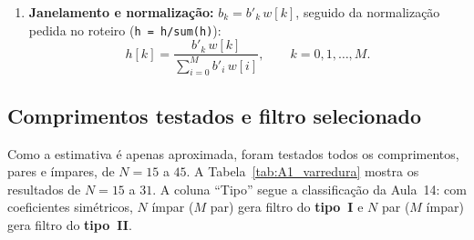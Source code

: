\documentclass[11pt,a4paper]{article}
\begin{document}
\begin{enumerate}[leftmargin=1.6em, itemsep=2pt, topsep=3pt]
    \item[7.] \textbf{Janelamento e normalização:} $b_k = b'_k\,w[k]$, seguido da normalização pedida no roteiro (\texttt{h = h/sum(h)}):
    \begin{equation}
        h[k] = \frac{b'_k\,w[k]}{\sum_{i=0}^{M} b'_i\,w[i]}, \qquad k = 0, 1, \dots, M.
        \label{eq:hnorm}
    \end{equation}
\end{enumerate}

\subsection{Comprimentos testados e filtro selecionado}

Como a estimativa é apenas aproximada, foram testados todos os comprimentos, pares e ímpares, de $N = 15$ a $45$. A Tabela~\ref{tab:A1_varredura} mostra os resultados de $N = 15$ a $31$. A coluna ``Tipo'' segue a classificação da Aula~14: com coeficientes simétricos, $N$ ímpar ($M$ par) gera filtro do \textbf{tipo~I} e $N$ par ($M$ ímpar) gera filtro do \textbf{tipo~II}.
\end{document}
